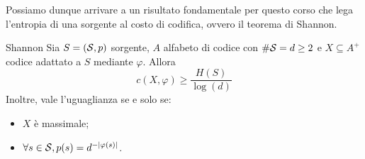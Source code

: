 Possiamo dunque arrivare a un risultato fondamentale per questo corso che lega l'entropia di una sorgente al costo di codifica, ovvero il teorema di Shannon.

\begin{theorem}[namedlabel={thm:shannon}{Shannon}]{Shannon}
  Sia \(S = (\mathcal{S},p)\) sorgente, \(A\) alfabeto di codice con \(\#\mathcal{S} = d \geq 2\) e \(X \subseteq A^+\) codice adattato a \(S\) mediante \(\varphi\).
  Allora
  \[c(X,\varphi) \geq \frac{H(S)}{\log\left(d\right)}\]
  Inoltre, vale l'uguaglianza se e solo se:
  \begin{itemize}
    \item \(X\) è massimale;
    \item \(\forall s\in \mathcal{S}, p(s) = d^{-\left|\varphi(s)\right|}\).
  \end{itemize}
\end{theorem}
